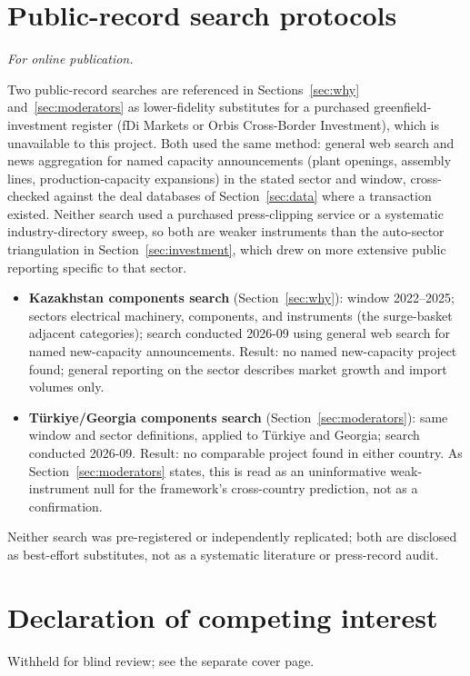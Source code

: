 \documentclass[12pt]{article}
\begin{document}
\section{Public-record search protocols}\label{app:search}
\emph{For online publication.}

\medskip
Two public-record searches are referenced in Sections~\ref{sec:why} and~\ref{sec:moderators} as lower-fidelity substitutes for a purchased greenfield-investment
register (fDi Markets or Orbis Cross-Border Investment), which is unavailable to this project.
Both used the same method: general web search and news aggregation for named capacity
announcements (plant openings, assembly lines, production-capacity expansions) in the stated
sector and window, cross-checked against the deal databases of Section~\ref{sec:data} where a
transaction existed. Neither search used a purchased press-clipping service or a systematic
industry-directory sweep, so both are weaker instruments than the auto-sector triangulation
in Section~\ref{sec:investment}, which drew on more extensive public reporting specific to
that sector.

\begin{itemize}
\item \textbf{Kazakhstan components search} (Section~\ref{sec:why}): window
2022--2025; sectors electrical machinery, components, and instruments (the surge-basket
adjacent categories); search conducted 2026-09 using general web search for named
new-capacity announcements. Result: no named new-capacity project found; general reporting on
the sector describes market growth and import volumes only.
\item \textbf{T\"urkiye/Georgia components search} (Section~\ref{sec:moderators}): same
window and sector definitions, applied to T\"urkiye and Georgia; search conducted 2026-09.
Result: no comparable project found in either country. As Section~\ref{sec:moderators}
states, this is read as an uninformative weak-instrument null for the framework's
cross-country prediction, not as a confirmation.
\end{itemize}

Neither search was pre-registered or independently replicated; both are disclosed as
best-effort substitutes, not as a systematic literature or press-record audit.

\section*{Declaration of competing interest}
Withheld for blind review; see the separate cover page.
\end{document}
